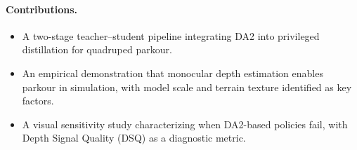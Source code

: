 \paragraph{Contributions.}
\begin{itemize}[nosep,leftmargin=*]
	\item A two-stage teacher--student pipeline integrating DA2 into
	      privileged distillation for quadruped parkour.
	\item An empirical demonstration that monocular depth estimation
	      enables parkour in simulation, with model scale and terrain
	      texture identified as key factors.
	\item A visual sensitivity study characterizing when DA2-based
	      policies fail, with Depth Signal Quality (DSQ) as a
	      diagnostic metric.
\end{itemize}
